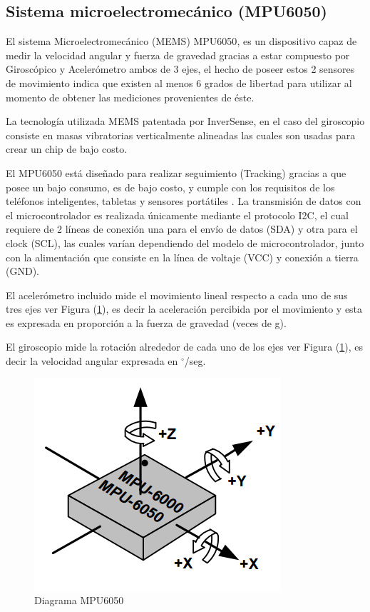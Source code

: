 \documentclass[12pt,a4paper]{article}
\newcommand{\grad}{$^{\circ}$}
\begin{document}
\newpage
\subsection{Sistema microelectromecánico (MPU6050)}
El sistema Microelectromecánico (MEMS) MPU6050\cite{MPU6050}, es un dispositivo capaz de medir la velocidad angular y fuerza de gravedad gracias a estar compuesto por Giroscópico y Acelerómetro ambos de 3 ejes, el hecho de poseer estos 2 sensores de movimiento indica que existen al menos 6 grados de libertad para utilizar al momento de obtener las mediciones provenientes de éste.

La tecnología utilizada MEMS patentada por InverSense, en el caso del giroscopio consiste en masas vibratorias verticalmente alineadas las cuales son usadas para crear un chip de bajo costo.

El MPU6050 está diseñado para realizar seguimiento (Tracking) gracias a que posee un bajo consumo, es de bajo costo, y cumple con los requisitos de los teléfonos inteligentes, tabletas y sensores portátiles \cite{MPU6050}.
La transmisión de datos con el microcontrolador es realizada únicamente mediante el protocolo I2C, el cual requiere de 2 líneas de conexión una para el envío de datos (SDA) y otra para el clock (SCL), las cuales varían dependiendo del modelo de microcontrolador, junto con la alimentación que consiste en la línea de voltaje (VCC) y conexión a tierra (GND).

El acelerómetro incluido mide el movimiento lineal respecto a cada uno de sus tres ejes ver Figura (\ref{fig:MPU6050}), es decir la aceleración percibida por el movimiento y esta es expresada en proporción a la fuerza de gravedad (veces de g).

El giroscopio mide la rotación alrededor de cada uno de los ejes ver Figura (\ref{fig:MPU6050}), es decir la velocidad angular expresada en \grad/seg.

\begin{figure}[H]
	\centering
	\includegraphics[scale=0.5]{images/MPU6050}
	\caption{Diagrama MPU6050}
	\label{fig:MPU6050}
\end{figure}
\end{document}
